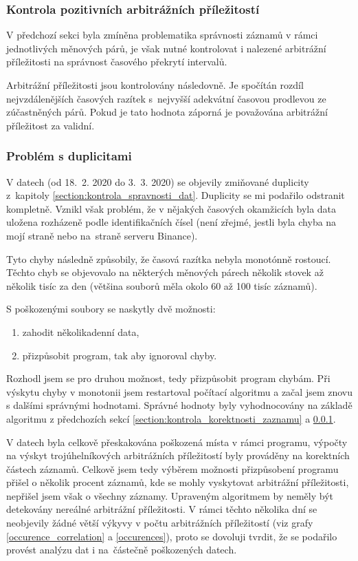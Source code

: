 \documentclass[thesis=B,czech]{FITthesis}[2019/03/21]
\begin{document}
\subsubsection{Kontrola pozitivních arbitrážních příležitostí}
\label{section:kontrola_pozitivnich_arbitraznich_prilezitosti}
V předchozí sekci byla zmíněna problematika správnosti záznamů v rámci jednotlivých měnových párů, je však nutné kontrolovat i nalezené arbitrážní příležitosti na správnost časového překrytí intervalů. 

Arbitrážní příležitosti jsou kontrolovány následovně. Je spočítán rozdíl nejvzdálenějších časových razítek s~nejvyšší adekvátní časovou prodlevou ze zúčastněných párů. Pokud je tato hodnota záporná je považována arbitrážní příležitost za validní.

\subsubsection{Problém s duplicitami}
V datech (od 18.~2. 2020 do 3.~3. 2020) se objevily zmiňované duplicity z~kapitoly \ref{section:kontrola_spravnosti_dat}. Duplicity se mi podařilo odstranit kompletně. Vznikl však problém, že v nějakých časových okamžicích byla data uložena rozházeně podle identifikačních čísel (není zřejmé, jestli byla chyba na mojí straně nebo na~straně serveru Binance).

Tyto chyby následně způsobily, že časová razítka nebyla monotónně rostoucí. Těchto chyb se objevovalo na některých měnových párech několik stovek až několik tisíc za den (většina souborů měla okolo 60 až 100 tisíc záznamů). 

S poškozenými soubory se naskytly dvě možnosti:
\begin{enumerate}
    \item zahodit několikadenní data,
    \item přizpůsobit program, tak aby ignoroval chyby.
\end{enumerate}

Rozhodl jsem se pro druhou možnost, tedy přizpůsobit program chybám. Při výskytu chyby v monotonii jsem restartoval počítací algoritmu a začal jsem znovu s dalšími správnými hodnotami. Správné hodnoty byly vyhodnocovány na základě algoritmu z předchozích sekcí \ref{section:kontrola_korektnosti_zaznamu} a \ref{section:kontrola_pozitivnich_arbitraznich_prilezitosti}.

V datech byla celkově přeskakována poškozená místa v rámci programu, výpočty na výskyt trojúhelníkových arbitrážních příležitostí byly prováděny na korektních částech záznamů. Celkově jsem tedy výběrem možnosti přizpůsobení programu přišel o několik procent záznamů, kde se mohly vyskytovat arbitrážní příležitosti, nepřišel jsem však o všechny záznamy. Upraveným algoritmem by neměly být detekovány nereálné arbitrážní příležitosti. V rámci těchto několika dní se neobjevily žádné větší výkyvy v počtu arbitrážních příležitostí (viz grafy \ref{occurence_correlation} a \ref{occurences}), proto se dovoluji tvrdit, že se podařilo provést analýzu dat i na~částečně poškozených datech.
\end{document}
